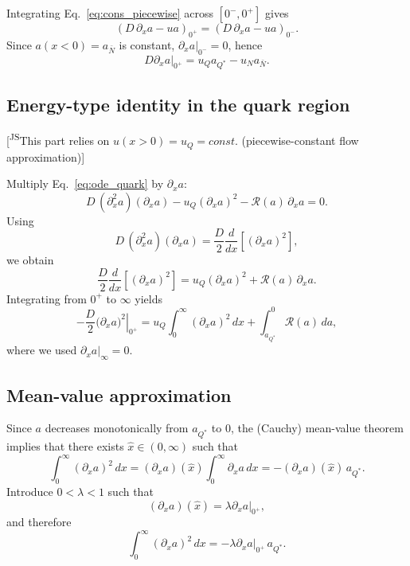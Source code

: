 \documentclass[11pt]{article}
\newcommand{\JScom}[1]{\textsf{\color{violet} [\textsuperscript{JS}#1]}}
\begin{document}
Integrating Eq.~\eqref{eq:cons_piecewise} across $[0^-,0^+]$ gives
\begin{equation}
\left(D\,\partial_x a - u a\right)_{0^+}=\left(D\,\partial_x a - u a\right)_{0^-}.
\end{equation}
Since $a(x<0)=a_{\bar N}$ is constant, $\left.\partial_x a\right|_{0^-}=0$, hence
\begin{equation}
D\left.\partial_x a\right|_{0^+}
=
u_Q a_{Q^*}
-
u_N a_{\bar N}.
\label{eq:boundary_general}
\end{equation}

\subsection{Energy-type identity in the quark region}

\JScom{This part relies on $u(x>0) = u_Q = const.$ (piecewise-constant flow approximation)}

Multiply Eq.~\eqref{eq:ode_quark} by $\partial_x a$:
\begin{equation}
D\,(\partial_x^2 a)(\partial_x a) - u_Q(\partial_x a)^2 - \mathcal R(a)\,\partial_x a = 0.
\end{equation}
Using
\begin{equation}
D\,(\partial_x^2 a)(\partial_x a)=\frac{D}{2}\frac{d}{dx}\!\left[(\partial_x a)^2\right],
\end{equation}
we obtain
\begin{equation}
\frac{D}{2}\frac{d}{dx}\!\left[(\partial_x a)^2\right]
=
u_Q(\partial_x a)^2
+
\mathcal R(a)\,\partial_x a.
\end{equation}
Integrating from $0^+$ to $\infty$ yields
\begin{equation}
-\frac{D}{2}\left.\bigl(\partial_x a\bigr)^2\right|_{0^+}
=
u_Q \int_0^\infty (\partial_x a)^2\,dx
+
\int_{a_{Q^*}}^{0}\mathcal R(a)\,da,
\label{eq:balance_piecewise}
\end{equation}
where we used $\left.\partial_x a\right|_{\infty}=0$.

\subsection{Mean-value approximation}

Since $a$ decreases monotonically from $a_{Q^*}$ to $0$, the (Cauchy) mean-value
theorem implies that there exists $\hat x\in(0,\infty)$ such that
\begin{equation}
\int_0^\infty (\partial_x a)^2\,dx
=
(\partial_x a)(\hat x)\int_0^\infty \partial_x a\,dx
=
-(\partial_x a)(\hat x)\,a_{Q^*}.
\end{equation}
Introduce $0<\lambda<1$ such that
\begin{equation}
(\partial_x a)(\hat x)=\lambda\left.\partial_x a\right|_{0^+},
\end{equation}
and therefore
\begin{equation}
\int_0^\infty (\partial_x a)^2\,dx
=
- \lambda \left.\partial_x a\right|_{0^+}\, a_{Q^*}.
\label{eq:int_sq_piecewise}
\end{equation}
\end{document}
